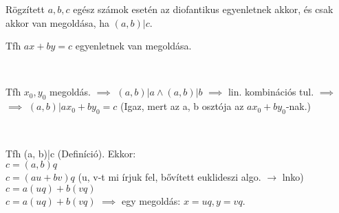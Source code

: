 \begin{frame}
  \begin{tcolorbox}[title={Tétel: A diofantikus egyenlet megoldása}]
    Rögzített $a, b, c$ egész számok esetén az  diofantikus egyenletnek akkor, és csak akkor van megoldása, ha $(a, b)|c$.
  \tcblower
    \mmedskip
    
    Tfh $ax + by = c$ egyenletnek van megoldása.\\
    \msmallskip
    
    \\
    \smallskip

    Tfh $x_0, y_0$ megoldás. $\implies$ $(a, b)|a \land (a, b)|b$ $\implies$ lin. kombinációs tul. $\implies$\\
    $\implies$ $(a, b)|ax_0 + by_0 = c$ (Igaz, mert az a, b osztója az $ax_0 + by_0$-nak.)\\
    \bigskip

    \\
    \smallskip

    Tfh (a, b)|c (Definíció). Ekkor:\\
    $c = (a, b)q$\\
    $c = (au + bv)q$  (u, v-t mi írjuk fel, bővített euklideszi algo. $\rightarrow$ lnko)\\
    $c = a(uq) + b(vq)$\\
    $c = a(uq) + b(vq)$ $\implies$ egy megoldás: $x = uq, y = vq$.\\
  \end{tcolorbox}
\end{frame}

